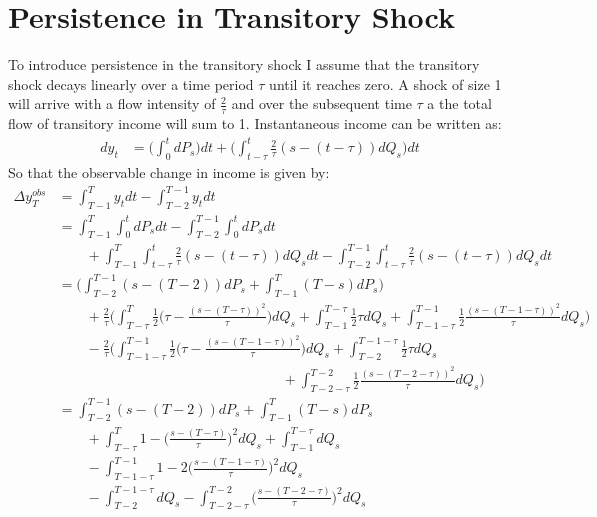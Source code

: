 \section{Persistence in Transitory Shock}
To introduce persistence in the transitory shock I assume that the transitory shock decays linearly over a time period $\tau$ until it reaches zero. A shock of size 1 will arrive with a flow intensity of $\frac{2}{\tau}$ and over the subsequent time $\tau$ a the total flow of transitory income will sum to 1. Instantaneous income can be written as:
 \begin{align*}
dy_t &= \Big(\int_{0}^{t} dP_s \Big) dt +\Big(\int_{t-\tau}^{t} \frac{2}{\tau}(s-(t-\tau)) dQ_s \Big)dt
 \end{align*}
So that the observable change in income is given by:
\begin{align}
\Delta y^{obs}_T &= \int_{T-1}^{T} y_t dt - \int_{T-2}^{T-1} y_t dt \nonumber \\ 
&= \int_{T-1}^{T} \int_{0}^{t}dP_s dt -\int_{T-2}^{T-1} \int_{0}^{t}dP_s dt \nonumber \\
& \qquad +  \int_{T-1}^{T} \int_{t-\tau}^{t} \frac{2}{\tau}(s-(t-\tau)) dQ_s dt -\int_{T-2}^{T-1}\int_{t-\tau}^{t} \frac{2}{\tau}(s-(t-\tau)) dQ_s dt \nonumber \\
&= \Big(\int_{T-2}^{T-1} (s-(T-2))dP_s  + \int_{T-1}^{T} (T-s)dP_s \Big) \nonumber \\
&  \qquad +\frac{2}{\tau} \Big(\int_{T-\tau}^{T} \frac{1}{2}\Big(\tau - \frac{(s-(T-\tau))^2}{\tau} \Big)dQ_s  +\int_{T-1}^{T-\tau} \frac{1}{2}\tau dQ_s  +\int_{T-1-\tau}^{T-1} \frac{1}{2}\frac{(s-(T-1-\tau))^2}{\tau} dQ_s \Big) \nonumber \\
& \qquad -\frac{2}{\tau}  \Big(\int_{T-1-\tau}^{T-1} \frac{1}{2}\Big(\tau - \frac{(s-(T-1-\tau))^2}{\tau} \Big)dQ_s  +\int_{T-2}^{T-1-\tau} \frac{1}{2}\tau dQ_s \nonumber \\
& \qquad \qquad \qquad \qquad \qquad \qquad \qquad \qquad  +\int_{T-2-\tau}^{T-2} \frac{1}{2}\frac{(s-(T-2-\tau))^2}{\tau} dQ_s \Big) \nonumber \\
&= \int_{T-2}^{T-1} (s-(T-2))dP_s  + \int_{T-1}^{T} (T-s)dP_s  \nonumber \\
&  \qquad +\int_{T-\tau}^{T} 1 - \Big(\frac{s-(T-\tau)}{\tau}\Big)^2 dQ_s  +\int_{T-1}^{T-\tau}  dQ_s   \nonumber \\
& \qquad - \int_{T-1-\tau}^{T-1} 1 - 2\Big(\frac{s-(T-1-\tau)}{\tau}\Big)^2 dQ_s \nonumber \\
& \qquad-  \int_{T-2}^{T-1-\tau}  dQ_s  -\int_{T-2-\tau}^{T-2} \Big(\frac{s-(T-2-\tau)}{\tau}\Big)^2 dQ_s 
\end{align}

